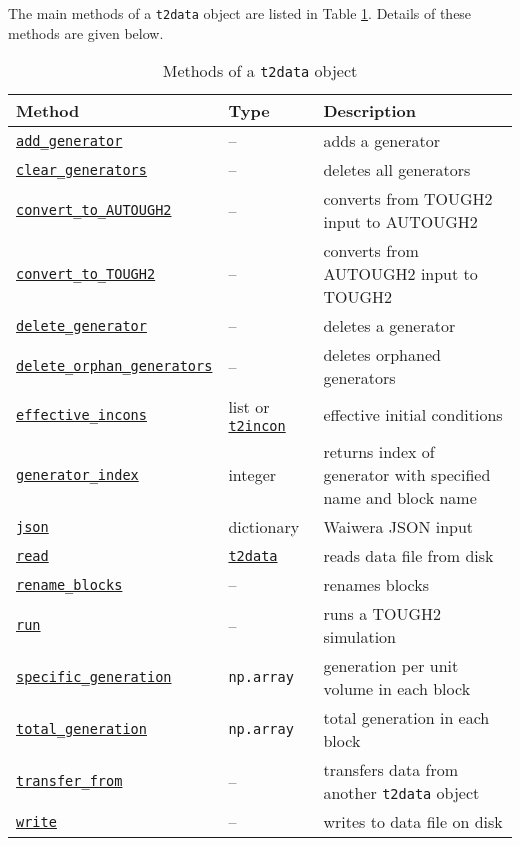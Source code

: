 The main methods of a \texttt{t2data} object are listed in Table \ref{tb:t2data_methods}.  Details of these methods are given below.

\begin{table}
  \begin{center}
    \begin{tabular}{|l|l|p{65mm}|}
      \hline
      \textbf{Method} & \textbf{Type} & \textbf{Description}\\
      \hline
      \hyperref[sec:t2data:add_generator]{\texttt{add\_generator}} & -- & adds a generator\\
      \hyperref[sec:t2data:clear_generators]{\texttt{clear\_generators}} & -- & deletes all generators\\
      \hyperref[sec:t2data:convert_to_AUTOUGH2]{\texttt{convert\_to\_AUTOUGH2}} & -- & converts from TOUGH2 input to AUTOUGH2\\
      \hyperref[sec:t2data:convert_to_TOUGH2]{\texttt{convert\_to\_TOUGH2}} & -- & converts from AUTOUGH2 input to TOUGH2\\
      \hyperref[sec:t2data:delete_generator]{\texttt{delete\_generator}} & -- & deletes a generator\\
      \hyperref[sec:t2data:delete_orphan_generators]{\texttt{delete\_orphan\_generators}} & -- & deletes orphaned generators\\
      \hyperref[sec:t2data:effective_incons]{\texttt{effective\_incons}} & list or \hyperref[incons]{\texttt{t2incon}} & effective initial conditions\\
      \hyperref[sec:t2data:generator_index]{\texttt{generator\_index}} & integer & returns index of generator with specified name and block name\\
      \hyperref[sec:t2data:json]{\texttt{json}} & dictionary & Waiwera JSON input \\
      \hyperref[sec:t2data:read]{\texttt{read}} & \hyperref[datafiles]{\texttt{t2data}} & reads data file from disk\\
      \hyperref[sec:t2data:rename_blocks]{\texttt{rename\_blocks}} & -- & renames blocks\\
      \hyperref[sec:t2data:run]{\texttt{run}} & -- & runs a TOUGH2 simulation\\
      \hyperref[sec:t2data:specific_generation]{\texttt{specific\_generation}} & \texttt{np.array} & generation per unit volume in each block\\
      \hyperref[sec:t2data:total_generation]{\texttt{total\_generation}} & \texttt{np.array} & total generation in each block\\
      \hyperref[sec:t2data:transfer_from]{\texttt{transfer\_from}} & -- & transfers data from another \texttt{t2data} object\\
      \hyperref[sec:t2data:write]{\texttt{write}} & -- & writes to data file on disk\\
      \hline
    \end{tabular}
    \caption{Methods of a \texttt{t2data} object}
    \label{tb:t2data_methods}
  \end{center}
\end{table}

